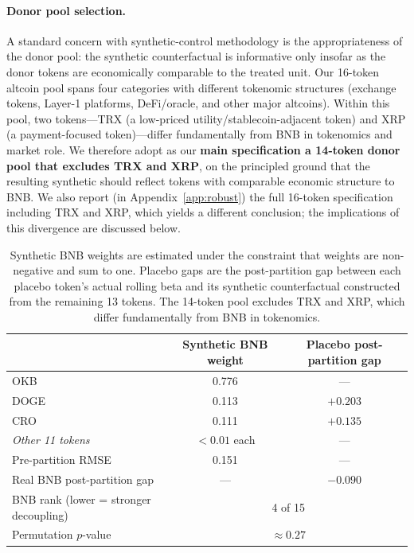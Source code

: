 \documentclass[11pt,a4paper]{article}
\begin{document}
\paragraph{Donor pool selection.} A standard concern with synthetic-control methodology is the appropriateness of the donor pool: the synthetic counterfactual is informative only insofar as the donor tokens are economically comparable to the treated unit. Our 16-token altcoin pool spans four categories with different tokenomic structures (exchange tokens, Layer-1 platforms, DeFi/oracle, and other major altcoins). Within this pool, two tokens---TRX (a low-priced utility/stablecoin-adjacent token) and XRP (a payment-focused token)---differ fundamentally from BNB in tokenomics and market role. We therefore adopt as our \textbf{main specification a 14-token donor pool that excludes TRX and XRP}, on the principled ground that the resulting synthetic should reflect tokens with comparable economic structure to BNB. We also report (in Appendix~\ref{app:robust}) the full 16-token specification including TRX and XRP, which yields a different conclusion; the implications of this divergence are discussed below.

\begin{table}[H]
\centering
\caption{Synthetic counterfactual with 14-token donor pool (TRX, XRP excluded): weights and placebo gaps}
\label{tab:synth}
\begin{tabular}{lcc}
\toprule
& \textbf{Synthetic BNB weight} & \textbf{Placebo post-partition gap} \\
\midrule
OKB & 0.776 & --- \\
DOGE & 0.113 & $+0.203$ \\
CRO & 0.111 & $+0.135$ \\
\textit{Other 11 tokens} & $<0.01$ each & --- \\
\midrule
Pre-partition RMSE & 0.151 & --- \\
Real BNB post-partition gap & --- & $-0.090$ \\
\midrule
BNB rank (lower = stronger decoupling) & \multicolumn{2}{c}{4 of 15} \\
Permutation $p$-value & \multicolumn{2}{c}{$\approx 0.27$} \\
\bottomrule
\end{tabular}
\caption*{\footnotesize Synthetic BNB weights are estimated under the constraint that weights are non-negative and sum to one. Placebo gaps are the post-partition gap between each placebo token's actual rolling beta and its synthetic counterfactual constructed from the remaining 13 tokens. The 14-token pool excludes TRX and XRP, which differ fundamentally from BNB in tokenomics.}
\end{table}
\end{document}
